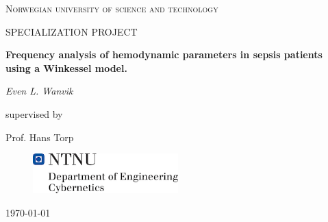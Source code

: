 \begin{titlepage}
	\centering
    {\scshape\LARGE Norwegian university of science and technology \par}
	\vspace{1cm}
	{\scshape\Large SPECIALIZATION PROJECT\par}
	\vspace{1.5cm}
	{\huge\bfseries Frequency analysis of hemodynamic parameters in sepsis patients using a Winkessel model.\par}
	\vspace{2cm}
	{\Large\itshape Even L. Wanvik\par}
	\vfill
	supervised by\par
	Prof. Hans Torp %

    \begin{figure}
    \centering
    \includegraphics[width=0.5\textwidth]{img/ntnu.png}
    \end{figure}
	\vfill

	{\large \today\par}
\end{titlepage}